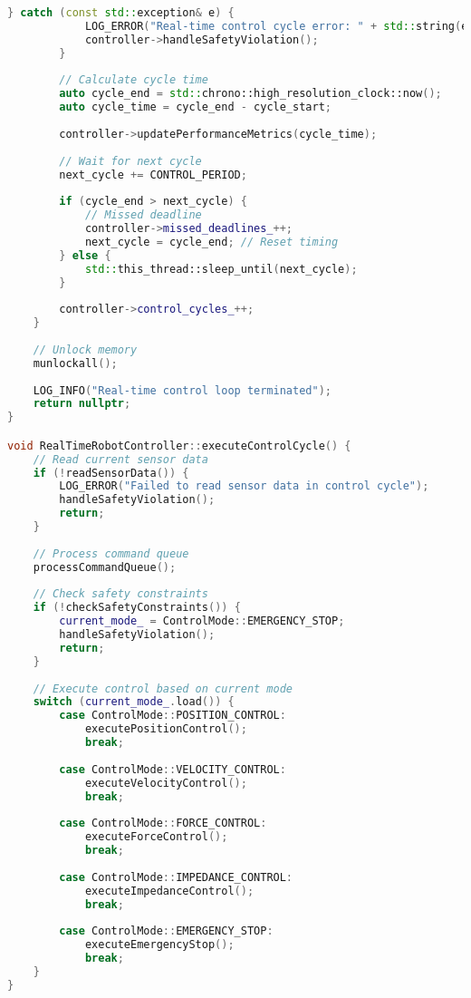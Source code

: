 \begin{lstlisting}[language=C++, caption={Real-Time Robot Controller}, label={lst:app-realtime-controller}]
        } catch (const std::exception& e) {
            LOG_ERROR("Real-time control cycle error: " + std::string(e.what()));
            controller->handleSafetyViolation();
        }
        
        // Calculate cycle time
        auto cycle_end = std::chrono::high_resolution_clock::now();
        auto cycle_time = cycle_end - cycle_start;
        
        controller->updatePerformanceMetrics(cycle_time);
        
        // Wait for next cycle
        next_cycle += CONTROL_PERIOD;
        
        if (cycle_end > next_cycle) {
            // Missed deadline
            controller->missed_deadlines_++;
            next_cycle = cycle_end; // Reset timing
        } else {
            std::this_thread::sleep_until(next_cycle);
        }
        
        controller->control_cycles_++;
    }
    
    // Unlock memory
    munlockall();
    
    LOG_INFO("Real-time control loop terminated");
    return nullptr;
}

void RealTimeRobotController::executeControlCycle() {
    // Read current sensor data
    if (!readSensorData()) {
        LOG_ERROR("Failed to read sensor data in control cycle");
        handleSafetyViolation();
        return;
    }
    
    // Process command queue
    processCommandQueue();
    
    // Check safety constraints
    if (!checkSafetyConstraints()) {
        current_mode_ = ControlMode::EMERGENCY_STOP;
        handleSafetyViolation();
        return;
    }
    
    // Execute control based on current mode
    switch (current_mode_.load()) {
        case ControlMode::POSITION_CONTROL:
            executePositionControl();
            break;
            
        case ControlMode::VELOCITY_CONTROL:
            executeVelocityControl();
            break;
            
        case ControlMode::FORCE_CONTROL:
            executeForceControl();
            break;
            
        case ControlMode::IMPEDANCE_CONTROL:
            executeImpedanceControl();
            break;
            
        case ControlMode::EMERGENCY_STOP:
            executeEmergencyStop();
            break;
    }
}


\end{lstlisting}
